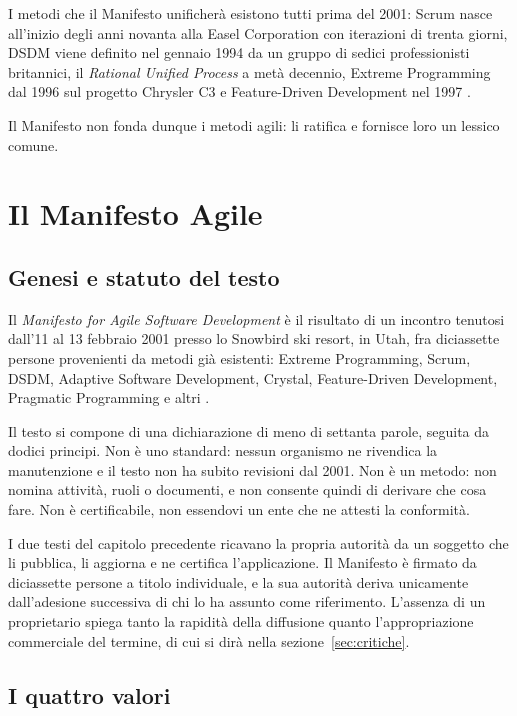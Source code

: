 I metodi che il Manifesto unificher\`a esistono tutti prima del 2001: Scrum
nasce all'inizio degli anni novanta alla Easel Corporation con iterazioni di
trenta giorni, DSDM viene definito nel gennaio 1994 da un gruppo di sedici
professionisti britannici, il \emph{Rational Unified Process} a met\`a decennio,
Extreme Programming dal 1996 sul progetto Chrysler C3 e Feature-Driven
Development nel 1997 \cite{larman2003}.

Il Manifesto non fonda dunque i metodi agili: li ratifica e fornisce loro un
lessico comune.

\section{Il Manifesto Agile}
\label{sec:manifesto}

\subsection{Genesi e statuto del testo}

Il \emph{Manifesto for Agile Software Development} \`e il risultato di un
incontro tenutosi dall'11 al 13 febbraio 2001 presso lo Snowbird ski resort, in
Utah, fra diciassette persone provenienti da metodi gi\`a esistenti:
Extreme Programming, Scrum, DSDM, Adaptive Software Development, Crystal,
Feature-Driven Development, Pragmatic Programming e altri \cite{agilemanifesto}.

Il testo si compone di una dichiarazione di meno di settanta parole, seguita da
dodici principi.
Non \`e uno standard: nessun organismo ne rivendica la manutenzione e il testo
non ha subito revisioni dal 2001. Non \`e un metodo: non nomina attivit\`a,
ruoli o documenti, e non consente quindi di derivare che cosa fare. Non \`e
certificabile, non essendovi un ente che ne attesti la conformit\`a.

I due testi del capitolo precedente ricavano la propria autorit\`a da un
soggetto che li pubblica, li aggiorna e ne certifica l'applicazione. Il
Manifesto \`e firmato da diciassette persone a titolo individuale, e la sua
autorit\`a deriva unicamente dall'adesione successiva di chi lo ha assunto come
riferimento. L'assenza di un proprietario spiega tanto la rapidit\`a della
diffusione quanto l'appropriazione commerciale del termine, di cui si dir\`a
nella sezione~\ref{sec:critiche}.

\subsection{I quattro valori}

